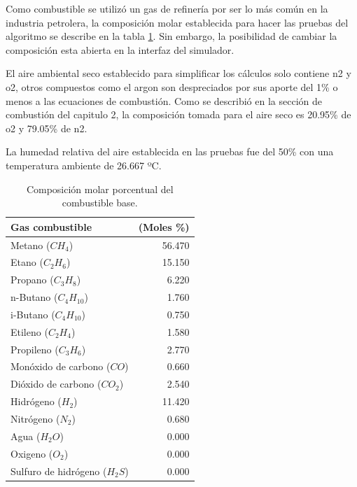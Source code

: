 \par Como combustible se utilizó un gas de refinería por ser lo más común en la industria petrolera, la composición molar establecida para hacer las pruebas del algoritmo se describe en la tabla \ref{tbl:combustible}. Sin embargo, la posibilidad de cambiar la composición esta abierta en la interfaz del simulador.

\par El aire ambiental seco establecido para simplificar los cálculos solo contiene \ac{n2} y \ac{o2}, otros compuestos como el \ac{argon} son despreciados por sus aporte del 1\% o menos a las ecuaciones de combustión. Como se describió en la sección de combustión del capitulo 2, la composición tomada para el aire seco es 20.95\% de \ac{o2} y 79.05\% de \ac{n2}.

\par La humedad relativa del aire establecida en las pruebas fue del 50\% con una temperatura ambiente de 26.667 ºC.

\begin{table}
\begin{center}
\caption[Composición del combustible base]{Composición molar porcentual del combustible base.}
\label{tbl:combustible}
\begin{tabular}{l|r}
	Gas combustible					& (Moles \%) \\
	\hline
	Metano ($CH_4$)					& 56.470 \\
	Etano ($C_2H_6$)				& 15.150 \\
	Propano ($C_3H_8$)				& 6.220 \\
	n-Butano ($C_4H_{10}$)			& 1.760 \\
	i-Butano ($C_4H_{10}$)			& 0.750 \\
	Etileno ($C_2H_4$)				& 1.580 \\
	Propileno ($C_3H_6$)			& 2.770 \\
	Monóxido de carbono ($CO$)		& 0.660 \\
	Dióxido de carbono ($CO_2$)		& 2.540 \\
	Hidrógeno ($H_2$)				& 11.420 \\
	Nitrógeno ($N_2$)				& 0.680 \\
	Agua ($H_2O$)					& 0.000 \\
	Oxigeno ($O_2$)					& 0.000 \\
	Sulfuro de hidrógeno ($H_2S$)	& 0.000 \\
\end{tabular}
\end{center}
\end{table}

